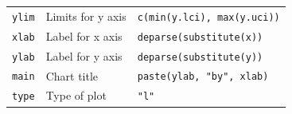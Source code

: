 \documentclass[12pt,a4paper]{book}
\theoremstyle{definition}
\theoremstyle{definition}
\theoremstyle{definition}
\theoremstyle{remark}
\begin{document}
\begin{longtable}[]{@{}lll@{}}
\begin{minipage}[t]{0.15\columnwidth}\raggedright
\texttt{ylim}\strut
\end{minipage} & \begin{minipage}[t]{0.32\columnwidth}\raggedright
Limits for y axis\strut
\end{minipage} & \begin{minipage}[t]{0.39\columnwidth}\raggedright
\texttt{c(min(y.lci),\ max(y.uci))}\strut
\end{minipage}\tabularnewline
\begin{minipage}[t]{0.15\columnwidth}\raggedright
\texttt{xlab}\strut
\end{minipage} & \begin{minipage}[t]{0.32\columnwidth}\raggedright
Label for x axis\strut
\end{minipage} & \begin{minipage}[t]{0.39\columnwidth}\raggedright
\texttt{deparse(substitute(x))}\strut
\end{minipage}\tabularnewline
\begin{minipage}[t]{0.15\columnwidth}\raggedright
\texttt{ylab}\strut
\end{minipage} & \begin{minipage}[t]{0.32\columnwidth}\raggedright
Label for y axis\strut
\end{minipage} & \begin{minipage}[t]{0.39\columnwidth}\raggedright
\texttt{deparse(substitute(y))}\strut
\end{minipage}\tabularnewline
\begin{minipage}[t]{0.15\columnwidth}\raggedright
\texttt{main}\strut
\end{minipage} & \begin{minipage}[t]{0.32\columnwidth}\raggedright
Chart title\strut
\end{minipage} & \begin{minipage}[t]{0.39\columnwidth}\raggedright
\texttt{paste(ylab,\ "by",\ xlab)}\strut
\end{minipage}\tabularnewline
\begin{minipage}[t]{0.15\columnwidth}\raggedright
\texttt{type}\strut
\end{minipage} & \begin{minipage}[t]{0.32\columnwidth}\raggedright
Type of plot\strut
\end{minipage} & \begin{minipage}[t]{0.39\columnwidth}\raggedright
\texttt{"l"}\strut
\end{minipage}\tabularnewline

\end{longtable}
\end{document}
